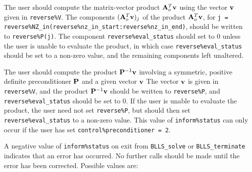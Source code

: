 \documentclass{galahad}
\newcommand{\packagename}{BLLS}
\begin{document}
\begin{description}
 The user should compute the matrix-vector product ${\mathbf{A}}_o^T {\mathbf{v}}$
     using the vector ${\mathbf{v}}$ given in {\tt reverse\%V}. The components
     $({\mathbf{A}}_o^T {\mathbf{v}})_j$ of the product ${\mathbf{A}}_o^T {\mathbf{v}}$, for
     {\tt j = reverse\%NZ\_in(reverse\%nz\_in\_start:reverse\%nz\_in\_end)},
     should be written to {\tt reverse\%P(j)}.
     The component {\tt reverse\%eval\_status} should set to 0 unless the
     user is unable to evaluate the product, in which case
     {\tt reverse\%eval\_status} should be set to a non-zero value, and the
      remaining components left unaltered.

 The user should compute the product ${\mathbf{P}}^{-1} {\mathbf{v}}$
     involving a symmetric, positive definite preconditioner ${\mathbf{P}}$ 
     and a given vector ${\mathbf{v}}$
     The vector ${\mathbf{v}}$ is given in {\tt reverse\%V}, and the
     product ${\mathbf{P}}^{-1} {\mathbf{v}}$ should be written to {\tt reverse\%P},
     and  {\tt reverse\%eval\_status} should be set to 0.
     If the user is unable to evaluate the product,
     the user need not set {\tt reverse\%P}, but
     should then set {\tt reverse\%eval\_status} to a non-zero value.
     This value of {\tt inform\%status} can only occur if the user 
     has set {\tt control\%preconditioner = 2}.

\end{description}




\galerrors
A negative value of {\tt inform\%status} on exit from
{\tt \packagename\_solve}
or
{\tt \packagename\_terminate}
indicates that an error has occurred. No further calls should be made
until the error has been corrected. Possible values are:
\end{document}
